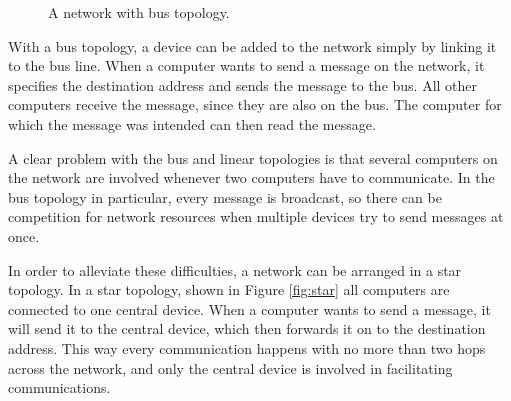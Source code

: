 \begin{figure}
    \centering
    \caption{A network with bus topology.}
    \label{fig:bus}
\end{figure}

With a bus topology, a device can be added to the network simply by linking it to the bus line. When a computer wants to send a message on the network, it specifies the destination address and sends the message to the bus. All other computers receive the message, since they are also on the bus. The computer for which the message was intended can then read the message.

A clear problem with the bus and linear topologies is that several computers on the network are involved whenever two computers have to communicate. In the bus topology in particular, every message is broadcast, so there can be competition for network resources when multiple devices try to send messages at once.

In order to alleviate these difficulties, a network can be arranged in a star topology. In a star topology, shown in Figure \ref{fig:star} all computers are connected to one central device. When a computer wants to send a message, it will send it to the central device, which then forwards it on to the destination address. This way every communication happens with no more than two hops across the network, and only the central device is involved in facilitating communications.

